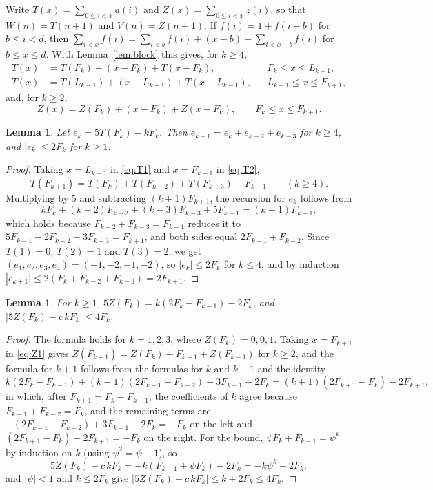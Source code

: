 \documentclass[]{interact}
\theoremstyle{plain}
\numberwithin{equation}{section}
\newtheorem{lemma}[thm]{Lemma}
\theoremstyle{definition}
\begin{document}
Write $T(x)=\sum_{0\le i<x}a(i)$ and $Z(x)=\sum_{0\le i<x}z(i)$, so that $W(n)=T(n+1)$ and $V(n)=Z(n+1)$. If $f(i)=1+f(i-b)$ for $b\le i<d$, then $\sum_{i<x}f(i)=\sum_{i<b}f(i)+(x-b)+\sum_{i<x-b}f(i)$ for $b\le x\le d$. With Lemma~\ref{lem:block} this gives, for $k\ge4$,
\begin{align}
T(x)&=T(F_k)+(x-F_k)+T(x-F_k), && F_k\le x\le L_{k-1},\label{eq:T1}\\
T(x)&=T(L_{k-1})+(x-L_{k-1})+T(x-L_{k-1}), && L_{k-1}\le x\le F_{k+1},\label{eq:T2}
\end{align}
and, for $k\ge2$,
\begin{equation}\label{eq:Z1}
Z(x)=Z(F_k)+(x-F_k)+Z(x-F_k),\qquad F_k\le x\le F_{k+1}.
\end{equation}

\begin{lemma}\label{lem:Tfib}
Let $e_k=5T(F_k)-kF_k$. Then $e_{k+1}=e_k+e_{k-2}+e_{k-3}$ for $k\ge4$, and $|e_k|\le 2F_k$ for $k\ge1$.
\end{lemma}

\begin{proof}
Taking $x=L_{k-1}$ in \eqref{eq:T1} and $x=F_{k+1}$ in \eqref{eq:T2},
\[
T(F_{k+1})=T(F_k)+T(F_{k-2})+T(F_{k-3})+F_{k-1}\qquad(k\ge4).
\]
Multiplying by $5$ and subtracting $(k+1)F_{k+1}$, the recursion for $e_k$ follows from
\[
kF_k+(k-2)F_{k-2}+(k-3)F_{k-3}+5F_{k-1}=(k+1)F_{k+1},
\]
which holds because $F_{k-2}+F_{k-3}=F_{k-1}$ reduces it to $5F_{k-1}-2F_{k-2}-3F_{k-3}=F_{k+1}$, and both sides equal $2F_{k-1}+F_{k-2}$. Since $T(1)=0$, $T(2)=1$ and $T(3)=2$, we get $(e_1,e_2,e_3,e_4)=(-1,-2,-1,-2)$, so $|e_k|\le2F_k$ for $k\le4$, and by induction $|e_{k+1}|\le2(F_k+F_{k-2}+F_{k-3})=2F_{k+1}$.
\end{proof}

\begin{lemma}\label{lem:Zfib}
For $k\ge1$, $5Z(F_k)=k(2F_k-F_{k-1})-2F_k$, and $|5Z(F_k)-c\,kF_k|\le4F_k$.
\end{lemma}

\begin{proof}
The formula holds for $k=1,2,3$, where $Z(F_k)=0,0,1$. Taking $x=F_{k+1}$ in \eqref{eq:Z1} gives $Z(F_{k+1})=Z(F_k)+F_{k-1}+Z(F_{k-1})$ for $k\ge2$, and the formula for $k+1$ follows from the formulas for $k$ and $k-1$ and the identity
\[
k(2F_k-F_{k-1})+(k-1)(2F_{k-1}-F_{k-2})+3F_{k-1}-2F_k=(k+1)(2F_{k+1}-F_k)-2F_{k+1},
\]
in which, after $F_{k+1}=F_k+F_{k-1}$, the coefficients of $k$ agree because $F_{k-1}+F_{k-2}=F_k$, and the remaining terms are $-(2F_{k-1}-F_{k-2})+3F_{k-1}-2F_k=-F_k$ on the left and $(2F_{k+1}-F_k)-2F_{k+1}=-F_k$ on the right. For the bound, $\psi F_k+F_{k-1}=\psi^k$ by induction on $k$ (using $\psi^2=\psi+1$), so
\[
5Z(F_k)-c\,kF_k=-k(F_{k-1}+\psi F_k)-2F_k=-k\psi^k-2F_k,
\]
and $|\psi|<1$ and $k\le2F_k$ give $|5Z(F_k)-c\,kF_k|\le k+2F_k\le4F_k$.
\end{proof}
\end{document}
